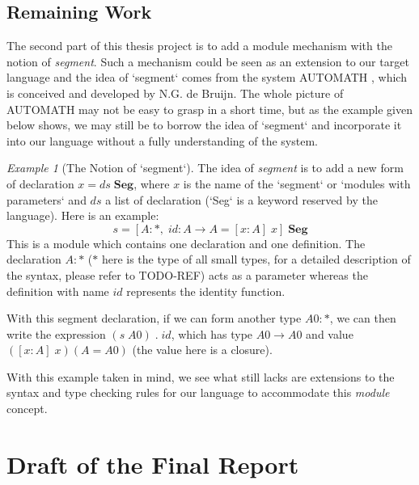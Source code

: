 \documentclass{article}
\theoremstyle{remark}
\newtheorem{example}{Example}
\begin{document}
\subsection{Remaining Work}
The second part of this thesis project is to add a module mechanism with the notion of \emph{segment}. Such a mechanism could be seen as an extension to our target language and the idea of `segment` comes from the system AUTOMATH \cite{de1994survey}, which is conceived and developed by N.G. de Bruijn. The whole picture of AUTOMATH may not be easy to grasp in a short time, but as the example given below shows, we may still be to borrow the idea of `segment` and incorporate it into our language without a fully understanding of the system.
\begin{example}[The Notion of `segment`]
  The idea of \emph{segment} is to add a new form of declaration $x = ds\; \textbf{Seg}$, where $x$ is the name of the `segment` or `modules with parameters` and $ds$ a list of declaration (`Seg` is a keyword reserved by the language). Here is an example:
  \[ s = [ A : *,\; id : A \to A = [x : A]\; x ]\; \textbf{Seg} \]
  This is a module which contains one declaration and one definition. The declaration \( A : * \) ($*$ here is the type of all small types, for a detailed description of the syntax, please refer to TODO-REF) acts as a parameter whereas the definition with name $id$ represents the identity function.

  With this segment declaration, if we can form another type \( A0 : * \), we can then write the expression \( (s \; A0) \; . \; id \), which has type $A0 \to A0$ and value $([x : A]\; x) (A = A0)$ (the value here is a closure).
\end{example}

With this example taken in mind, we see what still lacks are extensions to the syntax and type checking rules for our language to accommodate this \emph{module} concept. 

\section{Draft of the Final Report}
\end{document}
